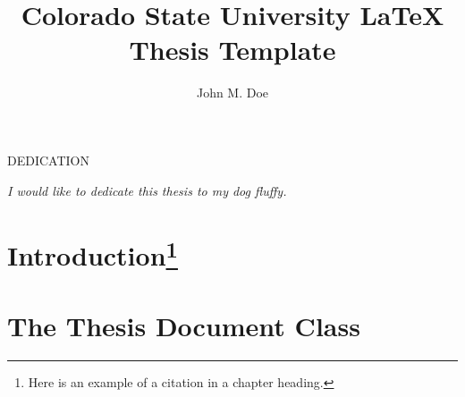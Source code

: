 \documentclass[master]{thesis}
\title{Colorado State University LaTeX Thesis Template}
\author{John M. Doe}
\begin{document}

\frontmatter %

\maketitle              %
\makemycopyright        %
\makeabstract           %
\makeacknowledgements   %

\begin{flatcenter} %

    DEDICATION

    \vfill %

    \noindent \textit{I would like to dedicate this thesis to my dog fluffy.}
    \vfill %
\end{flatcenter}
\newpage

\tableofcontents    %
\listoftables       %
\listoffigures      %

\mainmatter %

\chapter[Introduction]{Introduction\footnote{Here is an example of a citation in a chapter heading.}}
\label{chap:intro}

\chapter{The Thesis Document Class}
\label{chap:thesiscls}
\end{document}
